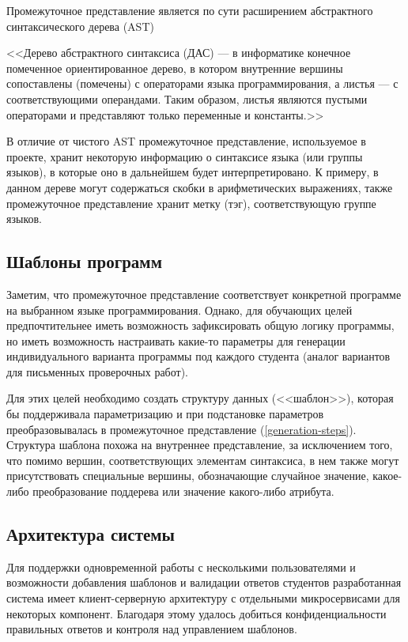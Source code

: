 Промежуточное представление является по сути расширением абстрактного синтаксического
дерева (AST)

<<Дерево абстрактного синтаксиса (ДАС) — в информатике конечное помеченное ориентированное дерево, в котором внутренние вершины сопоставлены (помечены) с операторами языка программирования, а листья — с соответствующими операндами. Таким образом, листья являются пустыми операторами и представляют только переменные и константы.>> \cite{ast}

В отличие от чистого AST промежуточное представление, используемое в проекте, хранит
некоторую информацию о синтаксисе языка (или группы языков), в которые оно в дальнейшем
будет интерпретировано. К примеру, в данном дереве могут содержаться скобки в арифметических выражениях,
также промежуточное представление хранит метку (тэг), соответствующую группе языков.

\subsection{Шаблоны программ}
\label{templates}

Заметим, что промежуточное представление соответствует конкретной программе на
выбранном языке программирования. Однако, для обучающих целей предпочтительнее
иметь возможность зафиксировать общую логику программы, но иметь возможность
настраивать какие-то параметры для генерации индивидуального варианта программы
под каждого студента (аналог вариантов для письменных проверочных работ).

Для этих целей необходимо создать структуру данных (<<шаблон>>), которая бы поддерживала
параметризацию и при подстановке параметров преобразовывалась в промежуточное
представление (\ref{generation-steps}).
Структура шаблона похожа на внутреннее представление, за исключением того, что
помимо вершин, соответствующих элементам синтаксиса, в нем также могут присутствовать
специальные вершины, обозначающие случайное значение, какое-либо преобразование
поддерева или значение какого-либо атрибута.

\subsection{Архитектура системы}
Для поддержки одновременной работы с несколькими пользователями и возможности
добавления шаблонов и валидации ответов студентов разработанная система имеет
клиент-серверную архитектуру с отдельными микросервисами для
некоторых компонент. Благодаря этому удалось добиться конфиденциальности правильных
ответов и контроля над управлением шаблонов.

